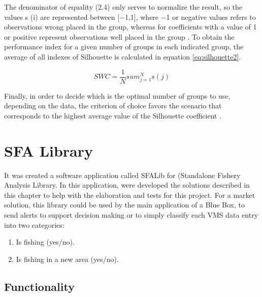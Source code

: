The denominator of equality (2.4) only serves to normalize the result, so the values s (i) are represented between [−1,1], where −1 or negative values refers to observations wrong placed in the group, whereas for coefficients with a value of 1 or positive represent observations well placed in the group \cite{Roelofsen2018BusinessAT}. 
To obtain the performance index for a given number of groups in each indicated group, the average of all indexes of Silhouette is calculated in equation \ref{eq:silhouette2}.

\begin{equation}
SWC = \frac{1}{N}sum_{j=1}^{N}s(j)
\label{eq:silhouette2}
\end{equation}

Finally, in order to decide which is the optimal number of groups to use, depending on the data, the criterion of choice favors the scenario that corresponds to the highest average value of the Silhouette coefficient \cite{Roelofsen2018BusinessAT}.




\section{SFA Library} %
\label{sub:sfa_library}

It was created a software application called SFALib for (Standalone Fishery Analysis Library. In this application, were developed the solutions described in this chapter to help with the elaboration and tests for this project. For a market solution, this library could be used by the main application of a Blue Box, to send alerts to support decision making or to simply classify each VMS data entry into two categories:
\begin{enumerate}
\item Is fishing (yes/no).
\item Is fishing in a new area (yes/no).
\end{enumerate}



\subsection{Functionality} %
\label{sub:functionality}

